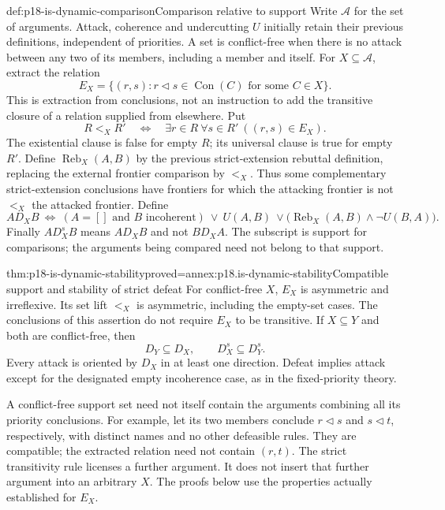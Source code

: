 \begin{hbdefinition}{def:p18-is-dynamic-comparison}{Comparison relative to support}
Write \(\mathcal A\) for the set of arguments. Attack, coherence and
undercutting \(U\) initially retain their previous definitions,
independent of priorities. A set is conflict-free when there is no
attack between any two of its members, including a member and itself.
For \(X\subseteq\mathcal A\), extract the relation
\[
 E_X=\{(r,s):r\triangleleft s\in\operatorname{Con}(C)
                       \text{ for some }C\in X\}.
\]
This is extraction from conclusions, not an instruction to add the
transitive closure of a relation supplied from elsewhere. Put
\[
 R<_{X}R'\quad\Longleftrightarrow\quad
       \exists r\in R\ \forall s\in R'\ ((r,s)\in E_X).
\]
The existential clause is false for empty \(R\); its universal clause
is true for empty \(R'\).
Define \(\operatorname{Reb}_X(A,B)\) by the previous strict-extension
rebuttal definition, replacing the external frontier comparison by
\(<_X\). Thus some complementary strict-extension conclusions have
frontiers for which the attacking frontier is not \(<_X\) the
attacked frontier. Define
\[
 A D_X B\ \Longleftrightarrow\
 (A=[]\text{ and }B\text{ incoherent})\ \lor\ U(A,B)\
 \lor\bigl(\operatorname{Reb}_X(A,B)\land\neg U(B,A)\bigr).
\]
Finally \(A D_X^sB\) means \(A D_XB\) and not \(B D_XA\).
The subscript is support for comparisons; the arguments being compared
need not belong to that support.
\end{hbdefinition}

\begin{hbtheorem}{thm:p18-is-dynamic-stability}{proved=annex:p18.is-dynamic-stability}{Compatible support and stability of strict defeat}
For conflict-free \(X\), \(E_X\) is asymmetric and irreflexive.
Its set lift \(<_X\) is asymmetric, including the empty-set cases.
The conclusions of this assertion do not require \(E_X\) to be
transitive.
If \(X\subseteq Y\) and both are conflict-free, then
\[
 D_Y\subseteq D_X,\qquad D_X^s\subseteq D_Y^s.
\]
Every attack is oriented by \(D_X\) in at least one direction.
Defeat implies attack except for the designated empty incoherence
case, as in the fixed-priority theory.
\end{hbtheorem}

A conflict-free support set need not itself contain the arguments
combining all its priority conclusions. For example, let its two
members conclude \(r\triangleleft s\) and \(s\triangleleft t\),
respectively, with distinct names and no other defeasible rules.
They are compatible; the extracted relation need not contain
\((r,t)\). The strict transitivity rule licenses a further argument.
It does not insert that further argument into an arbitrary \(X\).
The proofs below use the properties actually established for \(E_X\).

